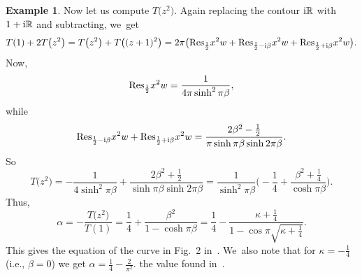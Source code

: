 \documentclass[pdftex]{sigma}
\theoremstyle{definition}
\newtheorem{Example}[Theorem]{Example}
\numberwithin{equation}{section}
\begin{document}
\begin{Example}
Now let us compute $T\big(z^2\big)$.
Again replacing the contour ${\rm i}\mathbb R$ with $1+{\rm i}\mathbb R$ and subtracting,
we~get
\[
T(1)+2T\big(z^2\big)=T\big(z^2\big)+T\big((z+1)^2\big)=2\pi\big({\rm Res}_{\frac{1}{2}}x^2w+{\rm Res}_{\frac{1}{2}-{\rm i}\beta }x^2w+{\rm Res}_{\frac{1}{2}+{\rm i}\beta }x^2w\big).
\]
Now,
\[
{\rm Res}_{\frac{1}{2}}x^2w=\frac{1}{4\pi\sinh^2\pi \beta},
\]
while
\[
{\rm Res}_{\frac{1}{2}-{\rm i}\beta }x^2w+{\rm Res}_{\frac{1}{2}+{\rm i}\beta }x^2w=\frac{2\beta^2-\frac{1}{2}}{\pi \sinh \pi\beta \sinh 2\pi \beta}.
\]
So
\[
T\big(z^2\big)=-\frac{1}{4\sinh^2\pi \beta}+\frac{2\beta^2+\frac{1}{2}}{\sinh \pi\beta \sinh 2\pi \beta}=
\frac{1}{\sinh^2\pi \beta}\bigg(-\frac{1}{4}+\frac{\beta^2+\frac{1}{4}}{\cosh \pi \beta}\bigg).
\]
Thus,
\[
\alpha=-\frac{T\big(z^2\big)}{T(1)}=\frac{1}{4}+\frac{\beta^2}{1-\cosh \pi\beta }=\frac{1}{4}-\frac{\kappa+\tfrac{1}{4}}{1-\cos\pi\sqrt{\kappa+\tfrac{1}{4}}}.
\]
This gives the equation of the curve in Fig.~2 in~\cite{BPR}. We~also note that for $\kappa=-\frac{1}{4}$ (i.e., $\beta=0$) we get
$\alpha=\frac{1}{4}-\frac{2}{\pi^2}$.
the value found in~\cite{BPR}.
\end{Example}
\end{document}
